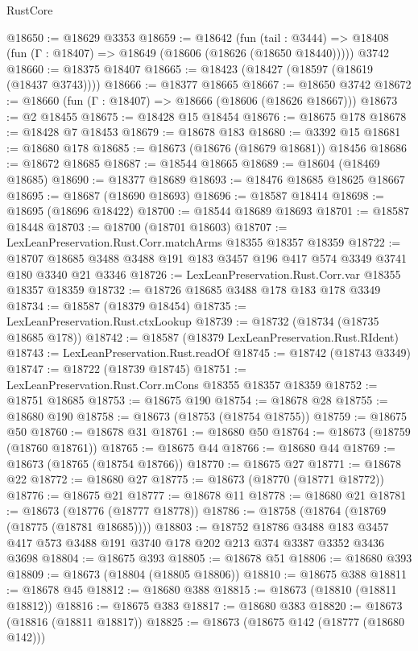 \begin{lexlean}{RustCore}
\begin{coremodule}
@18650 := @18629 @3353
@18659 := @18642
    (fun (tail : @3444) => @18408 (fun (Γ : @18407) => @18649 (@18606 (@18626 (@18650 @18440)))))
    @3742
@18660 := @18375 @18407
@18665 := @18423 (@18427 (@18597 (@18619 (@18437 @3743))))
@18666 := @18377 @18665
@18667 := @18650 @3742
@18672 := @18660 (fun (Γ : @18407) => @18666 (@18606 (@18626 @18667)))
@18673 := @2 @18455
@18675 := @18428 @15 @18454
@18676 := @18675 @178
@18678 := @18428 @7 @18453
@18679 := @18678 @183
@18680 := @3392 @15
@18681 := @18680 @178
@18685 := @18673 (@18676 (@18679 @18681)) @18456
@18686 := @18672 @18685
@18687 := @18544 @18665
@18689 := @18604 (@18469 @18685)
@18690 := @18377 @18689
@18693 := @18476 @18685 @18625 @18667
@18695 := @18687 (@18690 @18693)
@18696 := @18587 @18414
@18698 := @18695 (@18696 @18422)
@18700 := @18544 @18689 @18693
@18701 := @18587 @18448
@18703 := @18700 (@18701 @18603)
@18707 := LexLeanPreservation.Rust.Corr.matchArms @18355 @18357 @18359
@18722 := @18707 @18685 @3488 @3488 @191 @183 @3457 @196 @417 @574 @3349 @3741 @180 @3340 @21 @3346
@18726 := LexLeanPreservation.Rust.Corr.var @18355 @18357 @18359
@18732 := @18726 @18685 @3488 @178 @183 @178 @3349
@18734 := @18587 (@18379 @18454)
@18735 := LexLeanPreservation.Rust.ctxLookup
@18739 := @18732 (@18734 (@18735 @18685 @178))
@18742 := @18587 (@18379 LexLeanPreservation.Rust.RIdent)
@18743 := LexLeanPreservation.Rust.readOf
@18745 := @18742 (@18743 @3349)
@18747 := @18722 (@18739 @18745)
@18751 := LexLeanPreservation.Rust.Corr.mCons @18355 @18357 @18359
@18752 := @18751 @18685
@18753 := @18675 @190
@18754 := @18678 @28
@18755 := @18680 @190
@18758 := @18673 (@18753 (@18754 @18755))
@18759 := @18675 @50
@18760 := @18678 @31
@18761 := @18680 @50
@18764 := @18673 (@18759 (@18760 @18761))
@18765 := @18675 @44
@18766 := @18680 @44
@18769 := @18673 (@18765 (@18754 @18766))
@18770 := @18675 @27
@18771 := @18678 @22
@18772 := @18680 @27
@18775 := @18673 (@18770 (@18771 @18772))
@18776 := @18675 @21
@18777 := @18678 @11
@18778 := @18680 @21
@18781 := @18673 (@18776 (@18777 @18778))
@18786 := @18758 (@18764 (@18769 (@18775 (@18781 @18685))))
@18803 := @18752
    @18786
    @3488
    @183
    @3457
    @417
    @573
    @3488
    @191
    @3740
    @178
    @202
    @213
    @374
    @3387
    @3352
    @3436
    @3698
@18804 := @18675 @393
@18805 := @18678 @51
@18806 := @18680 @393
@18809 := @18673 (@18804 (@18805 @18806))
@18810 := @18675 @388
@18811 := @18678 @45
@18812 := @18680 @388
@18815 := @18673 (@18810 (@18811 @18812))
@18816 := @18675 @383
@18817 := @18680 @383
@18820 := @18673 (@18816 (@18811 @18817))
@18825 := @18673 (@18675 @142 (@18777 (@18680 @142)))

\end{coremodule}
\end{lexlean}

